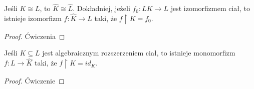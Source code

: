 \begin{wniosek}
    Jeśli $K\cong L$, to $\hat{K}\cong \hat{L}$. Dokładniej, jeżeli $f_0:LK\to L$ jest izomorfizmem ciał, to istnieje izomorfizm $f:\hat{K}\to\hat{L}$ taki, że $f\restriction K=f_0$.
\end{wniosek}
\begin{proof}
Ćwiczenia
\end{proof}

\begin{wniosek}
    Jeśli $K\subseteq L$ jest algebraicznym rozszerzeniem ciał, to istnieje monomorfizm $f:L\to \hat{K}$ taki, że $f\restriction K=id_K$.
\end{wniosek}

\begin{proof}
Ćwiczenie
\end{proof}

